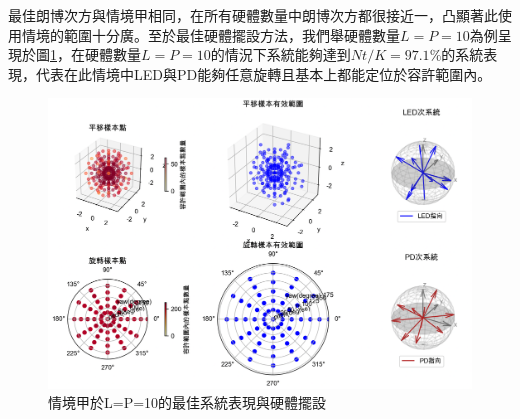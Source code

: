     最佳朗博次方與情境甲相同，在所有硬體數量中朗博次方都很接近一，凸顯著此使用情境的範圍十分廣。至於最佳硬體擺設方法，我們舉硬體數量$L=P=10$為例呈現於圖\ref{pic:d_1010}，在硬體數量$L=P=10$的情況下系統能夠達到$Nt/K=97.1\%$的系統表現，代表在此情境中LED與PD能夠任意旋轉且基本上都能定位於容許範圍內。

    \begin{figure}[htpb]
        \centering
        \includegraphics[width=15cm]{ch5pic/d_1010.png}
        \caption{情境甲於L=P=10的最佳系統表現與硬體擺設}
        \label{pic:d_1010}
    \end{figure}





